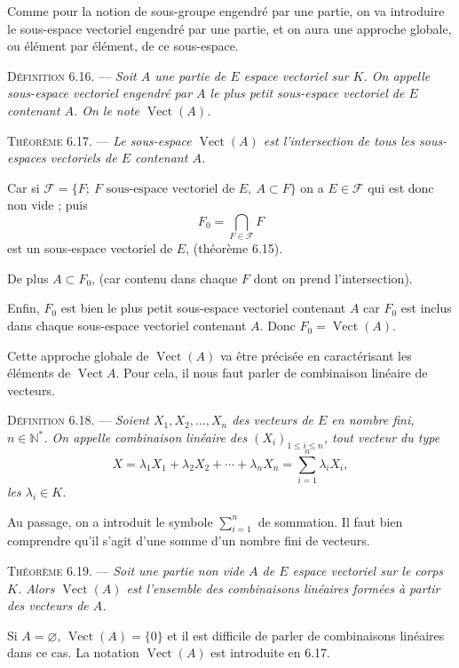 Comme pour la notion de sous-groupe engendré par une partie, on va introduire le sous-espace vectoriel engendré par une partie, et on aura une approche globale, ou élément par élément, de ce sous-espace.

\medskip\noindent\textsc{Définition 6.16.} --- \emph{Soit $A$ une partie de $E$ espace vectoriel sur $K$. On appelle sous-espace vectoriel engendré par $A$ le plus petit sous-espace vectoriel de $E$ contenant $A$. On le note $\operatorname{Vect}(A)$.}

\medskip\noindent\textsc{Théorème 6.17.} --- \emph{Le sous-espace $\operatorname{Vect}(A)$ est l'intersection de tous les sous-espaces vectoriels de $E$ contenant $A$.}

Car si $\mathcal F=\{F;\ F\text{ sous-espace vectoriel de }E,\ A\subset F\}$ on a $E\in\mathcal F$ qui est donc non vide ; puis
\[
F_0=\bigcap_{F\in\mathcal F}F
\]
est un sous-espace vectoriel de $E$, (théorème 6.15).

De plus $A\subset F_0$, (car contenu dans chaque $F$ dont on prend l'intersection).

Enfin, $F_0$ est bien le plus petit sous-espace vectoriel contenant $A$ car $F_0$ est inclus dans chaque sous-espace vectoriel contenant $A$. Donc $F_0=\operatorname{Vect}(A)$. \bookend

Cette approche globale de $\operatorname{Vect}(A)$ va être précisée en caractérisant les éléments de $\operatorname{Vect}A$. Pour cela, il nous faut parler de combinaison linéaire de vecteurs.

\medskip\noindent\textsc{Définition 6.18.} --- \emph{Soient $X_1,X_2,\ldots,X_n$ des vecteurs de $E$ en nombre fini, $n\in\mathbb N^*$. On appelle combinaison linéaire des $(X_i)_{1\le i\le n}$, tout vecteur du type
\[
X=\lambda_1X_1+\lambda_2X_2+\cdots+\lambda_nX_n=\sum_{i=1}^n\lambda_iX_i,
\]
les $\lambda_i\in K$.}

Au passage, on a introduit le symbole $\sum_{i=1}^n$ de sommation. Il faut bien comprendre qu'il s'agit d'une somme d'un nombre fini de vecteurs.

\medskip\noindent\textsc{Théorème 6.19.} --- \emph{Soit une partie non vide $A$ de $E$ espace vectoriel sur le corps $K$. Alors $\operatorname{Vect}(A)$ est l'ensemble des combinaisons linéaires formées à partir des vecteurs de $A$.}

Si $A=\varnothing$, $\operatorname{Vect}(A)=\{0\}$ et il est difficile de parler de combinaisons linéaires dans ce cas. La notation $\operatorname{Vect}(A)$ est introduite en 6.17.

